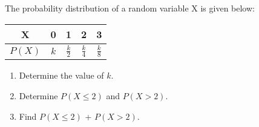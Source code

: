 \documentclass[journal,12pt,twocolumn]{IEEEtran}
\theoremstyle{remark}
\begin{document}
%
The probability distribution of a random variable X is given below:
\begin{table}[h]
    \centering
    \begin{tabular}{|c|c|c|c|c|}
        \hline
        X & 0 & 1 & 2 & 3 \\
        \hline
        $P(X)$ & $k$ & $\frac{k}{2}$ & $\frac{k}{4}$ & $\frac{k}{8}$ \\
        \hline
    \end{tabular}
\end{table}
\begin{enumerate}
    \item Determine the value of $k$.
    \item Determine $P(X \le 2)$ and $P(X > 2)$.
    \item Find $P(X \le 2)$ + $P(X > 2)$.
\end{enumerate}
\solution 
\end{document}
